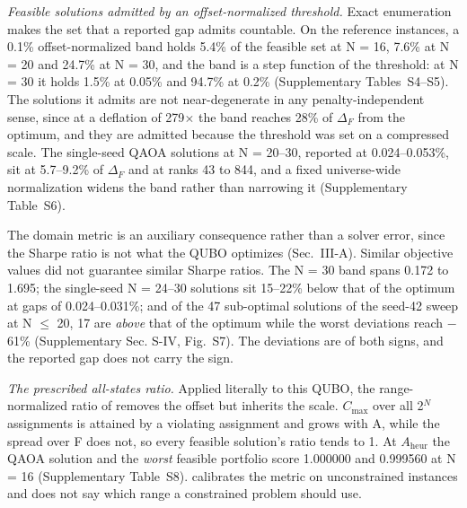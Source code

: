 \documentclass{ieeeaccess}
\begin{document}
\textit{Feasible solutions admitted by an offset-normalized threshold.} Exact enumeration makes the set that a reported gap admits countable. On the reference instances, a 0.1\% offset-normalized band holds 5.4\% of the feasible set at N = 16, 7.6\% at N = 20 and 24.7\% at N = 30, and the band is a step function of the threshold: at N = 30 it holds 1.5\% at 0.05\% and 94.7\% at 0.2\% (Supplementary Tables~S4--S5). The solutions it admits are not near-degenerate in any penalty-independent sense, since at a deflation of 279$\times$ the band reaches 28\% of $\Delta_{F}$ from the optimum, and they are admitted because the threshold was set on a compressed scale. The single-seed QAOA solutions at N = 20--30, reported at 0.024--0.053\%, sit at 5.7--9.2\% of $\Delta_{F}$ and at ranks 43 to 844, and a fixed universe-wide normalization widens the band rather than narrowing it (Supplementary Table~S6).


The domain metric is an auxiliary consequence rather than a solver error, since the Sharpe ratio is not what the QUBO optimizes (Sec.~III-A). Similar objective values did not guarantee similar Sharpe ratios. The N = 30 band spans 0.172 to 1.695; the single-seed N = 24--30 solutions sit 15--22\% below that of the optimum at gaps of 0.024--0.031\%; and of the 47 sub-optimal solutions of the seed-42 sweep at N $\leq$ 20, 17 are \textit{above} that of the optimum while the worst deviations reach $-$61\% (Supplementary Sec. S-IV, Fig.~S7). The deviations are of both signs, and the reported gap does not carry the sign.


\textit{The prescribed all-states ratio.} Applied literally to this QUBO, the range-normalized ratio of \cite{ref22} removes the offset but inherits the scale. $C_{\mathrm{max}}$ over all 2$^{N}$ assignments is attained by a violating assignment and grows with A, while the spread over F does not, so every feasible solution's ratio tends to 1. At $A_{\mathrm{heur}}$ the QAOA solution and the \textit{worst} feasible portfolio score 1.000000 and 0.999560 at N = 16 (Supplementary Table~S8). \cite{ref22} calibrates the metric on unconstrained instances and does not say which range a constrained problem should use.
\end{document}
